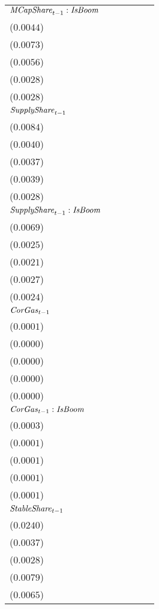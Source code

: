 \begin{tabular}{llllll}
${\it MCapShare}_{t-1}:{\it IsBoom}$    &      \makecell{$0.0071^{}$ \\ ($0.0044$)} &   \makecell{$0.0327^{***}$ \\ ($0.0073$)} &   \makecell{$0.0183^{***}$ \\ ($0.0056$)} &   \makecell{$0.0125^{***}$ \\ ($0.0028$)} &     \makecell{$0.0047^{*}$ \\ ($0.0028$)} \\
${\it SupplyShare}_{t-1}$               &   \makecell{$0.0369^{***}$ \\ ($0.0084$)} &      \makecell{$0.0061^{}$ \\ ($0.0040$)} &      \makecell{$0.0028^{}$ \\ ($0.0037$)} &   \makecell{$0.0218^{***}$ \\ ($0.0039$)} &      \makecell{$0.0013^{}$ \\ ($0.0028$)} \\
${\it SupplyShare}_{t-1}:{\it IsBoom}$  &     \makecell{$-0.0012^{}$ \\ ($0.0069$)} &      \makecell{$0.0012^{}$ \\ ($0.0025$)} &      \makecell{$0.0011^{}$ \\ ($0.0021$)} &  \makecell{$-0.0086^{***}$ \\ ($0.0027$)} &     \makecell{$-0.0015^{}$ \\ ($0.0024$)} \\
${\it CorGas}_{t-1}$                    &     \makecell{$-0.0000^{}$ \\ ($0.0001$)} &      \makecell{$0.0000^{}$ \\ ($0.0000$)} &     \makecell{$-0.0000^{}$ \\ ($0.0000$)} &     \makecell{$-0.0000^{}$ \\ ($0.0000$)} &    \makecell{$-0.0001^{*}$ \\ ($0.0000$)} \\
${\it CorGas}_{t-1}:{\it IsBoom}$       &     \makecell{$0.0005^{*}$ \\ ($0.0003$)} &     \makecell{$-0.0000^{}$ \\ ($0.0001$)} &      \makecell{$0.0000^{}$ \\ ($0.0001$)} &      \makecell{$0.0001^{}$ \\ ($0.0001$)} &      \makecell{$0.0001^{}$ \\ ($0.0001$)} \\
${\it StableShare}_{t-1}$               &   \makecell{$0.1263^{***}$ \\ ($0.0240$)} &      \makecell{$0.0029^{}$ \\ ($0.0037$)} &     \makecell{$-0.0021^{}$ \\ ($0.0028$)} &   \makecell{$0.0506^{***}$ \\ ($0.0079$)} &   \makecell{$0.0192^{***}$ \\ ($0.0065$)} \\

\end{tabular}
